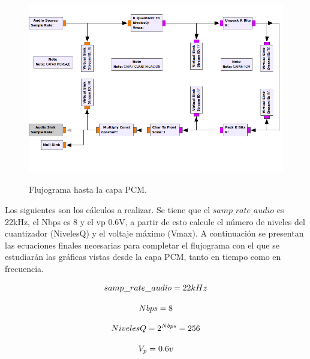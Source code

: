 \begin{itemize}
\begin{figure}[h!]
	\captionsetup{justification = raggedright, singlelinecheck = false}
	\caption{Flujograma hasta la capa PCM.} 
	\centering
	\includegraphics[scale=0.5]{Imagenes/T6.png}
	\label{fig:ej1_pcm_flujo}
\end{figure}


Los siguientes son los cálculos a realizar. Se tiene que el $samp \_rate\_audio$ es 22kHz, el Nbps es 8 y el vp 0.6V, a partir de esto calcule el número de niveles del cuantizador (NivelesQ) y el voltaje máximo (Vmax).
A continuación se presentan las ecuaciones finales necesarias para completar el flujograma con el que se estudiarán las gráficas vistas desde la capa PCM, tanto en tiempo como en frecuencia.

\begin{equation} \label{capcuatro_cincuentaycinco}
samp\_rate\_audio=22kHz \\
\end{equation}

\begin{equation} \label{capcuatro_cincuentayseis}
Nbps = 8 \\
\end{equation}

\begin{equation} \label{capcuatro_cincuentaysiete}
NivelesQ = 2^{Nbps} = 256\\
\end{equation}

\begin{equation} \label{capcuatro_cincuentayocho}
V_{p}= 0.6v\\
\end{equation}


\end{itemize}
